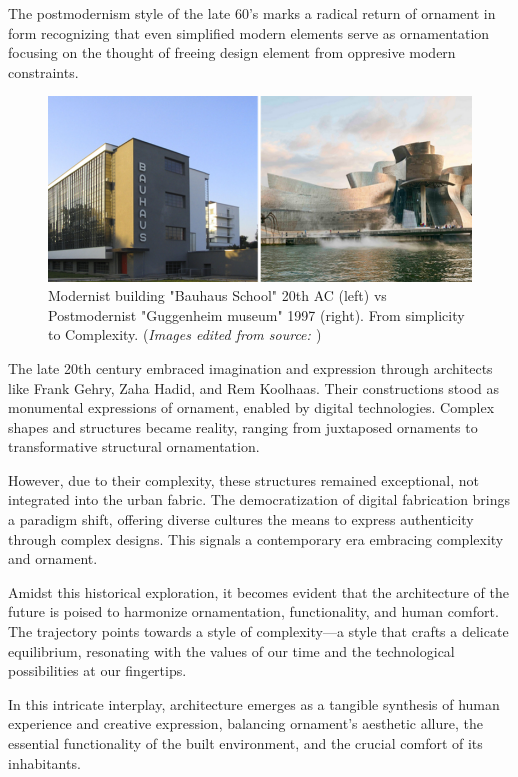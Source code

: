 The postmodernism style of the late 60's marks a radical return of ornament in form recognizing that even simplified modern elements serve as ornamentation focusing on the thought of freeing design element from oppresive modern constraints.

     \begin{figure}[htb]
          \centering
          \includegraphics[width= \linewidth]{Images/modernism vs postmodernism}
          \caption{Modernist building "Bauhaus School" 20th AC (left) vs Postmodernist "Guggenheim museum" 1997 (right). From simplicity to Complexity. (\textit{Images edited from source: \cite{Arora2023}})}
          \label{fig:Modernismvspostmodernism}
        \end{figure}

The late 20th century embraced imagination and expression through architects like Frank Gehry, Zaha Hadid, and Rem Koolhaas.
Their constructions stood as monumental expressions of ornament, enabled by digital technologies.
Complex shapes and structures became reality, ranging from juxtaposed ornaments to transformative structural ornamentation.

However, due to their complexity, these structures remained exceptional, not integrated into the urban fabric.
The democratization of digital fabrication brings a paradigm shift, offering diverse cultures the means to express authenticity through complex designs.
This signals a contemporary era embracing complexity and ornament.

Amidst this historical exploration, it becomes evident that the architecture of the future is poised to harmonize ornamentation, functionality, and human comfort.
The trajectory points towards a style of complexity—a style that crafts a delicate equilibrium, resonating with the values of our time and the technological possibilities at our fingertips.

In this intricate interplay, architecture emerges as a tangible synthesis of human experience and creative expression, balancing ornament's aesthetic allure, the essential functionality of the built environment, and the crucial comfort of its inhabitants.

